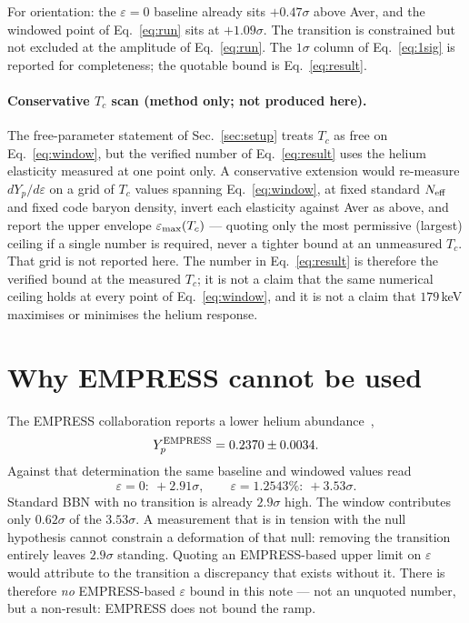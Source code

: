 \documentclass[aps,prd,twocolumn,superscriptaddress,nofootinbib,10pt]{revtex4-2}
\begin{document}
For orientation: the $\varepsilon=0$ baseline already sits $+0.47\sigma$ above Aver, and the
windowed point of Eq.~\eqref{eq:run} sits at $+1.09\sigma$. The transition is constrained but not
excluded at the amplitude of Eq.~\eqref{eq:run}. The $1\sigma$ column of Eq.~\eqref{eq:1sig} is
reported for completeness; the quotable bound is Eq.~\eqref{eq:result}.

\paragraph{Conservative $T_c$ scan (method only; not produced here).}
The free-parameter statement of Sec.~\ref{sec:setup} treats $T_c$ as free on
Eq.~\eqref{eq:window}, but the verified number of Eq.~\eqref{eq:result} uses the helium elasticity
measured at one point only. A conservative extension would re-measure $dY_p/d\varepsilon$ on a
grid of $T_c$ values spanning Eq.~\eqref{eq:window}, at fixed standard $N_{\rm eff}$ and fixed
code baryon density, invert each elasticity against Aver as above, and report the upper envelope
$\varepsilon_{\rm max}(T_c)$ --- quoting only the most permissive (largest) ceiling if a single
number is required, never a tighter bound at an unmeasured $T_c$. That grid is not reported here.
The number in Eq.~\eqref{eq:result} is therefore the verified bound at the measured $T_c$; it is
not a claim that the same numerical ceiling holds at every point of Eq.~\eqref{eq:window}, and it
is not a claim that $179\,$keV maximises or minimises the helium response.

\section{Why EMPRESS cannot be used}\label{sec:empress}

The EMPRESS collaboration reports a lower helium abundance~\cite{EMPRESS2022},
%
\begin{equation}
  Y_p^{\rm EMPRESS} = 0.2370 \pm 0.0034.
  \label{eq:empress}
\end{equation}
%
Against that determination the same baseline and windowed values read
%
\begin{equation}
  \varepsilon=0:\ +2.91\sigma,
  \qquad
  \varepsilon=1.2543\%:\ +3.53\sigma.
  \label{eq:empress_pull}
\end{equation}
%
Standard BBN with no transition is already $2.9\sigma$ high. The window contributes only
$0.62\sigma$ of the $3.53\sigma$. A measurement that is in tension with the null hypothesis
cannot constrain a deformation of that null: removing the transition entirely leaves $2.9\sigma$
standing. Quoting an EMPRESS-based upper limit on $\varepsilon$ would attribute to the transition
a discrepancy that exists without it. There is therefore \emph{no} EMPRESS-based $\varepsilon$
bound in this note --- not an unquoted number, but a non-result: EMPRESS does not bound the
ramp.
\end{document}
